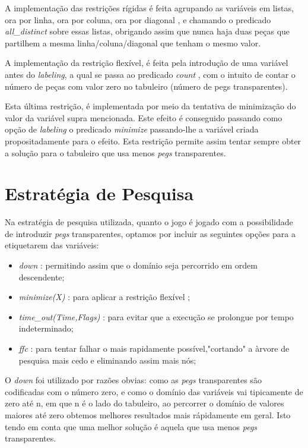 \documentclass{llncs}
\begin{document}
A implementa\c{c}\~{a}o das restri\c{c}\~{o}es r\'{i}gidas \'{e} feita agrupando as vari\'{a}veis em listas, ora por linha, ora por coluna, ora por diagonal , e chamando o predicado \emph{all\_distinct} sobre essas listas, obrigando assim que nunca haja duas pe\c{c}as que partilhem a mesma linha/coluna/diagonal que tenham o mesmo valor.

A implementa\c{c}\~{a}o da restri\c{c}\~{a}o flex\'{i}vel, \'{e} feita pela introdu\c{c}\~{a}o de uma vari\'{a}vel antes do \emph{labeling}, a qual se passa ao predicado \emph{count} , com o intuito de contar o n\'{u}mero de pe\c{c}as com valor zero no tabuleiro (n\'{u}mero de pegs transparentes).

Esta \'{u}ltima restri\c{c}\~{a}o, \'{e} implementada por meio da tentativa de minimiza\c{c}\~{a}o do valor da vari\'{a}vel supra mencionada. Este efeito \'{e} conseguido passando como op\c{c}\~{a}o de \emph{labeling} o predicado \emph{minimize} passando-lhe a vari\'{a}vel criada propositadamente para o efeito. Esta restri\c{c}\~{a}o permite assim tentar sempre obter a solu\c{c}\~{a}o para o tabuleiro que usa menos \emph{pegs} transparentes.  

\section{Estrat\'{e}gia de Pesquisa}


Na estrat\'{e}gia de pesquisa utilizada, quanto o jogo \'{e} jogado com a possibilidade de introduzir \emph{pegs} transparentes, optamos por incluir as seguintes op\c{c}\~{o}es para a etiquetarem das vari\'{a}veis:

\begin{itemize}
\item \emph{down} : permitindo assim que o dom\'{i}nio seja percorrido em ordem descendente;
\item \emph{minimize(X)} : para aplicar a restri\c{c}\~{a}o flex\'{i}vel ;
\item \emph{time\_out(Time,Flags)} : para evitar que a execu\c{c}\~{a}o se prolongue por tempo indeterminado;
\item \emph{ffc} : para tentar falhar o mais rapidamente poss\'{i}vel,"cortando" a \`{a}rvore de pesquisa mais cedo e eliminando assim mais n\'{os};
\end{itemize}

O \emph{down} foi utilizado por raz\~{o}es obvias: como as \emph{pegs} transparentes s\~{a}o codificadas com o n\'{u}mero zero, e como o dom\'{i}nio das vari\'{a}veis vai tipicamente de zero at\'{e} n, em que n \'{e} o lado do tabuleiro, ao percorrer o dom\'{i}nio de valores maiores at\'{e} zero obtemos melhores resultados mais r\'{a}pidamente em geral. Isto tendo em conta que uma melhor solu\c{c}\~{a}o \'{e} aquela que usa menos \emph{pegs} transparentes.
\end{document}
